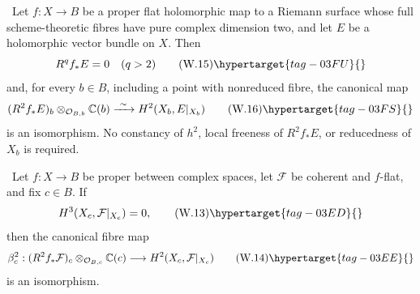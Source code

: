 
\begin{corollary}
\hypertarget{tag-03DV}{}\label{wbII:cor:surface-top-base-change}


\ Let $f:X\to B$ be a proper flat holomorphic map to a Riemann
surface whose full scheme-theoretic fibres have pure complex dimension two,
and let $E$ be a holomorphic vector bundle on $X$.  Then
\[
 R^qf_*E=0\quad(q>2)
 \tag{W.15}\hypertarget{tag-03FU}{}\label{wbII:eq:W:5.17-V}
\]
and, for every $b\in B$, including a point with nonreduced fibre, the
canonical map
\[
 (R^2f_*E)_b\otimes_{\mathcal O_{B,b}}\mathbb C(b)
 \xrightarrow{\ \sim\ }H^2(X_b,E|_{X_b})
 \tag{W.16}\hypertarget{tag-03FS}{}\label{wbII:eq:W:5.17-T}
\]
is an isomorphism.  No constancy of $h^2$, local freeness of $R^2f_*E$, or
reducedness of $X_b$ is required.
\end{corollary}

\begin{proposition}
\hypertarget{tag-03II}{}\label{wbII:prop:analytic-base-change}


\ Let $f:X\to B$ be proper between complex spaces, let
$\mathcal F$ be coherent and $f$-flat, and fix $c\in B$.  If
\[
H^3(X_c,\mathcal F|_{X_c})=0,
\tag{W.13}\hypertarget{tag-03ED}{}\label{wbII:eq:W:5.16}
\]
then the canonical fibre map
\[
\beta_c^2:
(R^2f_*\mathcal F)_c\otimes_{\mathcal O_{B,c}}\mathbb C(c)
\longrightarrow H^2(X_c,\mathcal F|_{X_c})
\tag{W.14}\hypertarget{tag-03EE}{}\label{wbII:eq:W:5.17}
\]
is an isomorphism.
\end{proposition}


